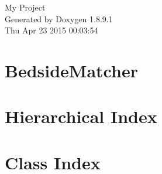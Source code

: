 \documentclass[twoside]{book}
\newcommand{\+}{\discretionary{\mbox{\scriptsize$\hookleftarrow$}}{}{}}
\newcommand{\clearemptydoublepage}{%
  \newpage{\pagestyle{empty}\cleardoublepage}%
}
\begin{document}
\hypersetup{pageanchor=false,
             bookmarks=true,
             bookmarksnumbered=true,
             pdfencoding=unicode
            }
\begin{titlepage}
\vspace*{7cm}
\begin{center}%
{\Large My Project }\\
\vspace*{1cm}
{\large Generated by Doxygen 1.8.9.1}\\
\vspace*{0.5cm}
{\small Thu Apr 23 2015 00:03:54}\\
\end{center}
\end{titlepage}
\clearemptydoublepage
\tableofcontents
\clearemptydoublepage
{}
\hypersetup{pageanchor=true}

\chapter{Bedside\+Matcher}
\label{md__r_e_a_d_m_e}
\hypertarget{md__r_e_a_d_m_e}{}

\chapter{Hierarchical Index}

\chapter{Class Index}

\end{document}
